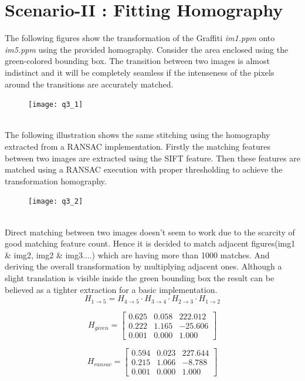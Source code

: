 \section*{Scenario-II : Fitting Homography}
The following figures show the transformation of the Graffiti \textit{im1.ppm} onto \textit{im5.ppm} using the provided homography. Consider the area enclosed using the green-colored bounding box. The transition between two images is almost indistinct and it will be completely seamless if the intenseness of the pixels around the transitions are accurately matched.
\begin{figure}[h]
    \begin{center}
        \texttt{[image: q3\_1]}
    \end{center}
\end{figure}
\\
The following illustration shows the same stitching using the homography extracted from a RANSAC implementation. Firstly the matching features between two images are extracted using the SIFT feature. Then these features are matched using a RANSAC execution with proper thresholding to achieve the transformation homography.
\begin{figure}[h]
    \begin{center}
        \texttt{[image: q3\_2]}
    \end{center}
\end{figure}
\\
Direct matching between two images doesn't seem to work due to the scarcity of good matching feature count. Hence it is decided to match adjacent figures(img1 \& img2, img2 \& img3....) which are having more than 1000 matches. And deriving the overall transformation by multiplying adjacent ones. Although a slight translation is visible inside the green bounding box the result can be believed as a tighter extraction for a basic implementation.
$$H_{1\to5}=H_{4\to5}\cdot H_{3\to4}\cdot H_{2\to3}\cdot H_{1\to2}$$
\vspace*{.2cm}
\begin{minipage}{.48\textwidth}
    \begin{equation*}
        H_{given}=\begin{bmatrix}
            0.625 & 0.058 & 222.012 \\
            0.222 & 1.165 & -25.606 \\
            0.001 & 0.000 & 1.000
        \end{bmatrix}
    \end{equation*}

\end{minipage}
\begin{minipage}{.48\textwidth}
    \begin{equation*}
        H_{ransac}=\begin{bmatrix}
            0.594 & 0.023 & 227.644 \\
            0.215 & 1.066 & -8.788  \\
            0.001 & 0.000 & 1.000
        \end{bmatrix}
    \end{equation*}
\end{minipage}
